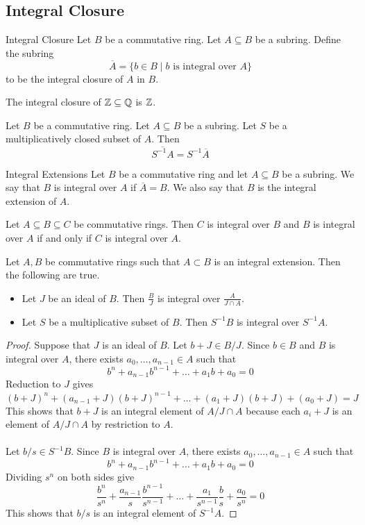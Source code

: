 \documentclass[a4paper]{article}
\begin{document}
\subsection{Integral Closure}
\begin{defn}{Integral Closure}{} Let $B$ be a commutative ring. Let $A\subseteq B$ be a subring. Define the subring $$\overline{A}=\{b\in B\;|\;b\text{ is integral over }A\}$$ to be the integral closure of $A$ in $B$. 
\end{defn}

\begin{eg}{}{} The integral closure of $\mathbb{Z}\subseteq\mathbb{Q}$ is $\mathbb{Z}$. 
\end{eg}

\begin{prp}{}{} Let $B$ be a commutative ring. Let $A\subseteq B$ be a subring. Let $S$ be a multiplicatively closed subset of $A$. Then $$\overline{S^{-1}A}=S^{-1}\overline{A}$$
\end{prp}

\begin{defn}{Integral Extensions}{} Let $B$ be a commutative ring and let $A\subseteq B$ be a subring. We say that $B$ is integral over $A$ if $\overline{A}=B$. We also say that $B$ is the integral extension of $A$. 
\end{defn}

\begin{lmm}{}{} Let $A\subseteq B\subseteq C$ be commutative rings. Then $C$ is integral over $B$ and $B$ is integral over $A$ if and only if $C$ is integral over $A$. 
\end{lmm}

\begin{prp}{}{} Let $A,B$ be commutative rings such that $A\subset B$ is an integral extension. Then the following are true. 
\begin{itemize}
\item Let $J$ be an ideal of $B$. Then $\frac{B}{J}$ is integral over $\frac{A}{J\cap A}$. 
\item Let $S$ be a multiplicative subset of $B$. Then $S^{-1}B$ is integral over $S^{-1}A$. 
\end{itemize} \tcbline
\begin{proof}
Suppose that $J$ is an ideal of $B$. Let $b+J\in B/J$. Since $b\in B$ and $B$ is integral over $A$, there exists $a_0,\dots,a_{n-1}\in A$ such that $$b^n+a_{n-1}b^{n-1}+\dots+a_1b+a_0=0$$ Reduction to $J$ gives $$(b+J)^n+(a_{n-1}+J)(b+J)^{n-1}+\dots+(a_1+J)(b+J)+(a_0+J)=J$$ This shows that $b+J$ is an integral element of $A/J\cap A$ because each $a_i+J$ is an element of $A/J\cap A$ by restriction to $A$. \\~\\

Let $b/s\in S^{-1}B$. Since $B$ is integral over $A$, there exists $a_0,\dots,a_{n-1}\in A$ such that $$b^n+a_{n-1}b^{n-1}+\dots+a_1b+a_0=0$$ Dividing $s^n$ on both sides give $$\frac{b^n}{s^n}+\frac{a_{n-1}}{s}\frac{b^{n-1}}{s^{n-1}}+\dots+\frac{a_1}{s^{n-1}}\frac{b}{s}+\frac{a_0}{s^n}=0$$ This shows that $b/s$ is an integral element of $S^{-1}A$. 
\end{proof}
\end{prp}
\end{document}
